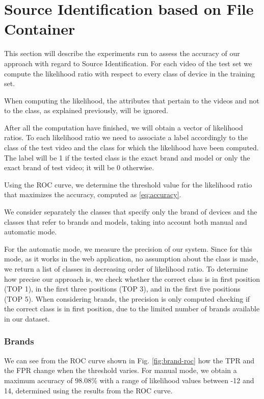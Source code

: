 \section{Source Identification based on File Container}

This section will describe the experiments run to assess the accuracy of our approach with regard to Source Identification. For each video of the test set we compute the likelihood ratio with respect to every class of device in the training set. 

When computing the likelihood, the attributes that pertain to the videos and not to the class, as explained previously, will be ignored.

After all the computation have finished, we will obtain a vector of likelihood ratios. To each likelihood ratio we need to associate a label accordingly to the class of the test video and the class for which the likelihood have been computed. The label will be 1 if the tested class is the exact brand and model or only the exact brand of test video; it will be 0 otherwise.

Using the ROC curve, we determine the threshold value for the likelihood ratio that maximizes the accuracy, computed as \ref{eq:accuracy}.

We consider separately the classes that specify only the brand of devices and the classes that refer to brands and models, taking into account both manual and automatic mode.

For the automatic mode, we measure the precision of our system. Since for this mode, as it works in the web application, no assumption about the class is made, we return a list of classes in decreasing order of likelihood ratio. To determine how precise our approach is, we check whether the correct class is in first position (TOP 1), in the first three positions (TOP 3), and in the first five positions (TOP 5). When considering brands, the precision is only computed checking if the correct class is in first position, due to the limited number of brands available in our dataset.

\subsubsection*{Brands}

We can see from the ROC curve shown in Fig. \ref{fig:brand-roc} how the TPR and the FPR change when the threshold varies.
For manual mode, we obtain a maximum accuracy of 98.08\% with a range of likelihood values between -12 and 14, determined using the results from the ROC curve.

